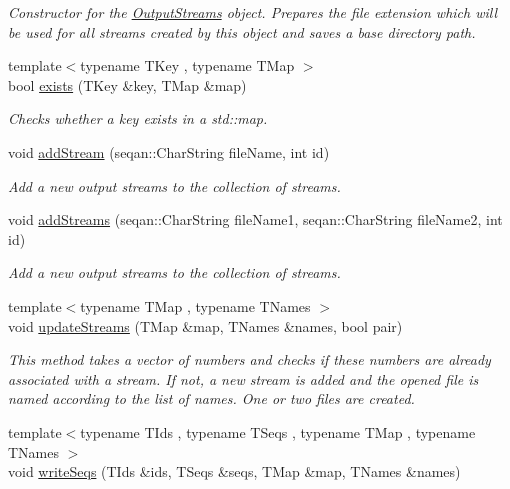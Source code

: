 \begin{DoxyCompactItemize}
\begin{DoxyCompactList}\small\item\em Constructor for the \hyperlink{class_output_streams}{Output\-Streams} object. Prepares the file extension which will be used for all streams created by this object and saves a base directory path. \end{DoxyCompactList}\item 
{\footnotesize template$<$typename T\-Key , typename T\-Map $>$ }\\bool \hyperlink{class_output_streams_a14babf33ab80c1dd5d158f2ddd9d5625}{exists} (T\-Key \&key, T\-Map \&map)
\begin{DoxyCompactList}\small\item\em Checks whether a key exists in a std\-::map. \end{DoxyCompactList}\item 
void \hyperlink{class_output_streams_a57fe721eed419cf693ad16ac2d065783}{add\-Stream} (seqan\-::\-Char\-String file\-Name, int id)
\begin{DoxyCompactList}\small\item\em Add a new output streams to the collection of streams. \end{DoxyCompactList}\item 
void \hyperlink{class_output_streams_ae724b4ed3aebd3ddd9d4426cdc6c856b}{add\-Streams} (seqan\-::\-Char\-String file\-Name1, seqan\-::\-Char\-String file\-Name2, int id)
\begin{DoxyCompactList}\small\item\em Add a new output streams to the collection of streams. \end{DoxyCompactList}\item 
{\footnotesize template$<$typename T\-Map , typename T\-Names $>$ }\\void \hyperlink{class_output_streams_aa807680b5625932c7cdd65c25023aaa3}{update\-Streams} (T\-Map \&map, T\-Names \&names, bool pair)
\begin{DoxyCompactList}\small\item\em This method takes a vector of numbers and checks if these numbers are already associated with a stream. If not, a new stream is added and the opened file is named according to the list of names. One or two files are created. \end{DoxyCompactList}\item 
{\footnotesize template$<$typename T\-Ids , typename T\-Seqs , typename T\-Map , typename T\-Names $>$ }\\void \hyperlink{class_output_streams_afcbc59e33ac5ea2487bd8db8dd3250c3}{write\-Seqs} (T\-Ids \&ids, T\-Seqs \&seqs, T\-Map \&map, T\-Names \&names)

\end{DoxyCompactItemize}
